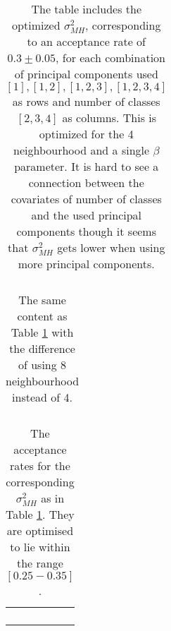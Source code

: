 \documentclass[a4paper,english]{article}
\begin{document}
\begin{table}[H]
  \centering
  \begin{tabular}{c c c}
    
  \end{tabular}
  \caption{The table includes the optimized $\sigma_{MH}^2$, corresponding to an acceptance rate of $0.3 \pm 0.05$, for each combination of principal components used ${[1], [1,2], [1,2,3], [1,2,3,4]}$ as rows and number of classes $[2, 3, 4]$ as columns. This is optimized for the 4 neighbourhood and a single $\beta$ parameter. It is hard to see a connection between the covariates of number of classes and the used principal components though it seems that $\sigma_{MH}^2$ gets lower when using more principal components.}
  \label{tab:sigma:n1}
\end{table}

\begin{table}[H]
  \centering
  \begin{tabular}{c c c}
    
  \end{tabular}
  \caption{The same content as Table \ref{tab:sigma:n1} with the difference of using 8 neighbourhood instead of 4.}
  \label{tab:sigma:n2}
\end{table}


\begin{table}[H]
  \centering
  \begin{tabular}{c c c}
     &  &  \\
     &  &  \\
     &  &  \\
     &  &  \\
  \end{tabular}
  \caption{The acceptance rates for the corresponding $\sigma_{MH}^2$ as in Table \ref{tab:sigma:n1}. They are optimised to lie within the range $[0.25 - 0.35]$.}
  \label{tab:acceptance:n1}
\end{table}
\end{document}
